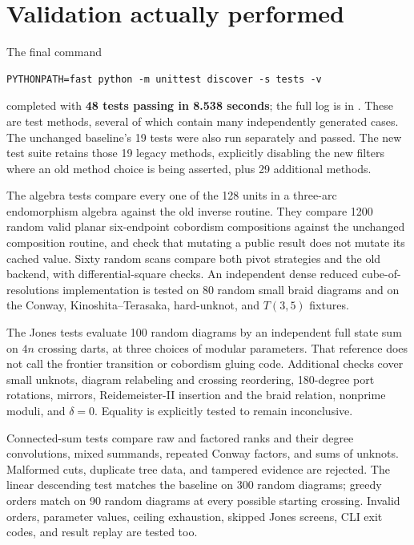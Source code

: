\documentclass[11pt,a4paper]{article}
\theoremstyle{definition}\newtheorem{remark}[theorem]{Remark}
\begin{document}
\section{Validation actually performed}
\label{sec:tests}
The final command
\begin{lstlisting}
PYTHONPATH=fast python -m unittest discover -s tests -v
\end{lstlisting}
completed with \textbf{48 tests passing in 8.538 seconds}; the full log is in
. These are test methods, several of which contain
many independently generated cases. The unchanged baseline's 19 tests were
also run separately and passed. The new test suite retains those 19 legacy
methods, explicitly disabling the new filters where an old method choice is
being asserted, plus 29 additional methods.

The algebra tests compare every one of the 128 units in a three-arc
endomorphism algebra against the old inverse routine. They compare 1200
random valid planar six-endpoint cobordism compositions against the unchanged
composition routine, and check that mutating a public result does not mutate
its cached value. Sixty random scans compare both pivot strategies and the old
backend, with differential-square checks. An independent dense reduced
cube-of-resolutions implementation is tested on 80 random small braid diagrams
and on the Conway, Kinoshita--Terasaka, hard-unknot, and $T(3,5)$ fixtures.

The Jones tests evaluate 100 random diagrams by an independent full state sum
on $4n$ crossing darts, at three choices of modular parameters. That reference
does not call the frontier transition or cobordism gluing code. Additional
checks cover small unknots, diagram relabeling and crossing reordering,
180-degree port rotations, mirrors, Reidemeister-II insertion and the braid
relation, nonprime moduli, and $\delta=0$. Equality is explicitly tested to remain
inconclusive.

Connected-sum tests compare raw and factored ranks and their degree
convolutions, mixed summands, repeated Conway factors, and sums of unknots.
Malformed cuts, duplicate tree data, and tampered evidence are rejected. The
linear descending test matches the baseline on 300 random diagrams; greedy
orders match on 90 random diagrams at every possible starting crossing.
Invalid orders, parameter values, ceiling exhaustion, skipped Jones screens,
CLI exit codes, and result replay are tested too.
\end{document}
